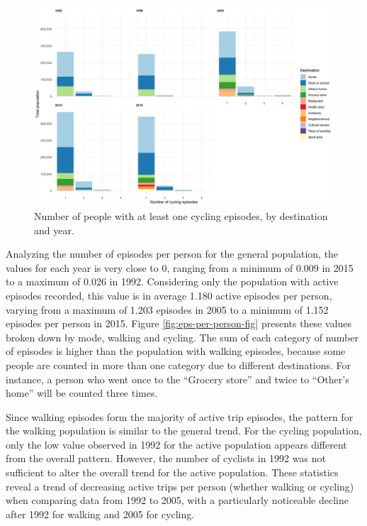 \documentclass[preprint, 3p,
authoryear]{elsarticle} %
\begin{document}
\begin{figure}

{\centering \includegraphics[width=1\linewidth]{figures/people_per_ep_cycling} 

}

\caption{Number of people with at least one cycling episodes, by destination and year.}\label{fig:cycling-population-by-year-destination-fig}
\end{figure}

Analyzing the number of episodes per person for the general population,
the values for each year is very close to 0, ranging from a minimum of
0.009 in 2015 to a maximum of 0.026 in 1992. Considering only the
population with active episodes recorded, this value is in average 1.180
active episodes per person, varying from a maximum of 1.203 episodes in
2005 to a minimum of 1.152 episodes per person in 2015. Figure
\ref{fig:eps-per-person-fig} presents these values broken down by mode,
walking and cycling. The sum of each category of number of episodes is
higher than the population with walking episodes, because some people
are counted in more than one category due to different destinations. For
instance, a person who went once to the ``Grocery store'' and twice to
``Other's home'' will be counted three times.

Since walking episodes form the majority of active trip episodes, the
pattern for the walking population is similar to the general trend. For
the cycling population, only the low value observed in 1992 for the
active population appears different from the overall pattern. However,
the number of cyclists in 1992 was not sufficient to alter the overall
trend for the active population. These statistics reveal a trend of
decreasing active trips per person (whether walking or cycling) when
comparing data from 1992 to 2005, with a particularly noticeable decline
after 1992 for walking and 2005 for cycling.
\end{document}
